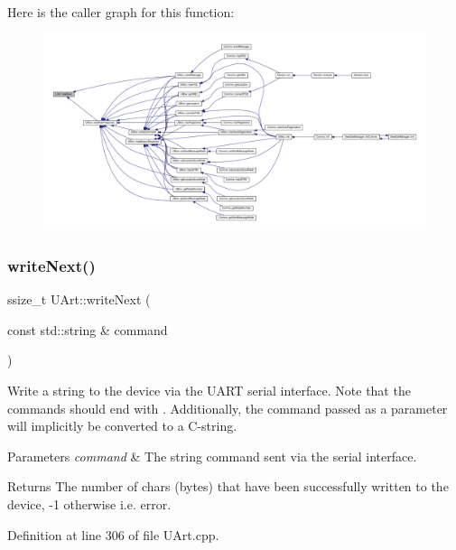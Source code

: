 Here is the caller graph for this function\+:\nopagebreak
\begin{figure}[H]
\begin{center}
\leavevmode
\includegraphics[width=350pt]{d9/d88/class_u_art_aa4818ca67447e251680b4b8d28c8bba5_icgraph}
\end{center}
\end{figure}
\mbox{\label{class_u_art_aad1ddb133fe430a92527584eec2e674f}} 
\subsubsection{\texorpdfstring{write\+Next()}{writeNext()}\hspace{0.1cm}{\footnotesize\ttfamily [1/2]}}
{\footnotesize\ttfamily ssize\+\_\+t U\+Art\+::write\+Next (\begin{DoxyParamCaption}\item[{const std\+::string \&}]{command }\end{DoxyParamCaption})}

Write a string to the device via the U\+A\+RT serial interface. Note that the commands should end with . Additionally, the command passed as a parameter will implicitly be converted to a C-\/string.


\begin{DoxyParams}{Parameters}
{\em command} & The string command sent via the serial interface. \\
\hline
\end{DoxyParams}
\begin{DoxyReturn}{Returns}
The number of chars (bytes) that have been successfully written to the device, -\/1 otherwise i.\+e. error. 
\end{DoxyReturn}


Definition at line 306 of file U\+Art.\+cpp.


